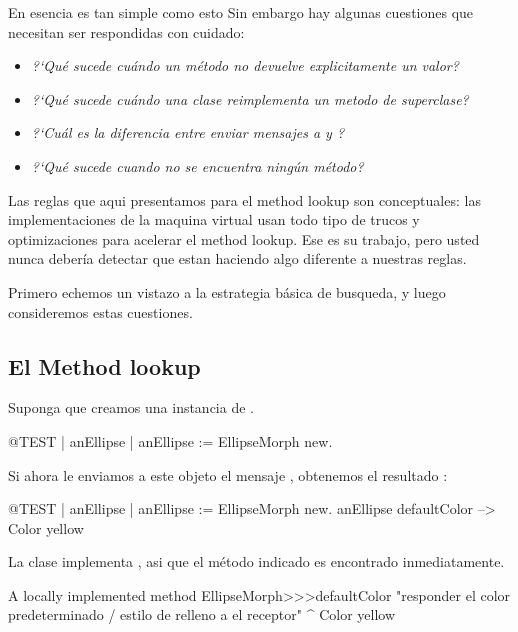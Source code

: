 \documentclass[a4paper,10pt,twoside]{book}
\begin{document}
En esencia es tan simple como esto
Sin embargo hay algunas cuestiones que necesitan ser respondidas con cuidado:

\begin{itemize}
  \item \emph{?`Qu\'e sucede cu\'ando un m\'etodo no devuelve explicitamente un valor?}
  \item \emph{?`Qu\'e sucede cu\'ando una clase reimplementa un metodo de superclase?}
  \item \emph{?`Cu\'al es la diferencia entre enviar mensajes a  y ?}
  \item \emph{?`Qu\'e sucede cuando no se encuentra ning\'un m\'etodo?}
\end{itemize}

Las reglas que aqui presentamos para el method lookup son conceptuales: las implementaciones de la maquina virtual usan todo tipo de trucos y optimizaciones para acelerar el method lookup. 
Ese es su trabajo, pero usted nunca deber\'ia detectar que estan haciendo algo diferente a nuestras reglas.

Primero echemos un vistazo a la estrategia b\'asica de busqueda, y luego consideremos estas cuestiones.

\subsection{El Method lookup}
Suponga que creamos una instancia de .
\begin{code}{@TEST | anEllipse |}
anEllipse := EllipseMorph new.
\end{code}
\noindent
Si ahora le enviamos a este objeto el mensaje , obtenemos el resultado :
\begin{code}{@TEST | anEllipse | anEllipse := EllipseMorph new.}
anEllipse defaultColor --> Color yellow
\end{code}
\noindent
La clase  implementa , asi que el m\'etodo indicado es encontrado inmediatamente.

\begin{method}[defaultColor]{A locally implemented method}
EllipseMorph>>>defaultColor
	"responder el color predeterminado / estilo de relleno a el receptor"
	^ Color yellow
\end{method}
\end{document}
